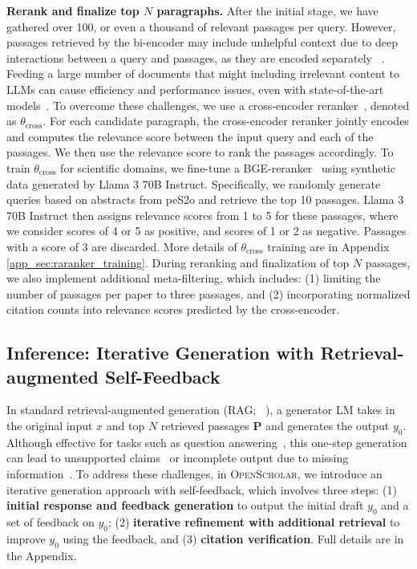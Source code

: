 \documentclass{article} %
\newcommand{\model}{\textsc{OpenScholar}\xspace}
\renewcommand{\paragraph}[1]{\noindent \textbf{#1}}
\begin{document}
\paragraph{Rerank and finalize top $N$ paragraphs.} 
After the initial stage, we have gathered over 100, or even a thousand of relevant passages per query. However, passages retrieved by the bi-encoder may include unhelpful context due to deep interactions between a query and passages, as they are encoded separately ~\citep{asai-etal-2023-task}. 
Feeding a large number of documents that might including irrelevant content to LLMs can cause efficiency and performance issues, even with state-of-the-art models~\citep{liu2023lost,xu2023recomp}. 
To overcome these challenges, we use a cross-encoder reranker~\citep{nogueira2019passage,bge_embedding}, denoted as $\theta_\text{cross}$. For each candidate paragraph, the cross-encoder reranker jointly encodes and computes the relevance score between the input query and each of the passages. We then use the relevance score to rank the passages accordingly. 
To train $\theta_\text{cross}$ for scientific domains, we fine-tune a BGE-reranker~\citep{bge_embedding} using synthetic data generated by Llama 3 70B Instruct. Specifically, we randomly generate queries based on abstracts from peS2o and retrieve the top 10 passages. Llama 3 70B Instruct then assigns relevance scores from 1 to 5 for these passages, where we consider scores of 4 or 5 as positive, and scores of 1 or 2 as negative. Passages with a score of 3 are discarded. 
More details of $\theta_\text{cross}$ training are in Appendix \ref{app_sec:raranker_training}. 
During reranking and finalization of top $N$ passages, we also implement additional meta-filtering, which includes: (1) limiting the number of passages per paper to three passages, and (2) incorporating normalized citation counts into relevance scores predicted by the cross-encoder. 

\subsection{Inference: Iterative Generation with Retrieval-augmented Self-Feedback}
\label{subsec:inference_algorithm}

In standard retrieval-augmented generation (RAG; ~\citealt{lewis2020retrieval,ram2023context}), a generator LM takes in the original input $x$ and top $N$ retrieved passages $\mathbf{P}$ and generates the output $y_0$. Although effective for tasks such as question answering~\citep{mallen2022not}, this one-step generation can lead to unsupported claims~\citep{liu2023evaluating} or incomplete output due to missing information~\citep{asai2024selfrag,jiang2023active}.  
To address these challenges, in \model, we introduce an iterative generation approach with self-feedback, which involves three steps: (1) {\bf initial response and feedback generation} to output the initial draft $y_0$ and a set of feedback on $y_0$; (2) {\bf iterative refinement with additional retrieval} to improve $y_0$ using the feedback, and (3) {\bf citation verification}. Full details are in the Appendix. 
\end{document}
